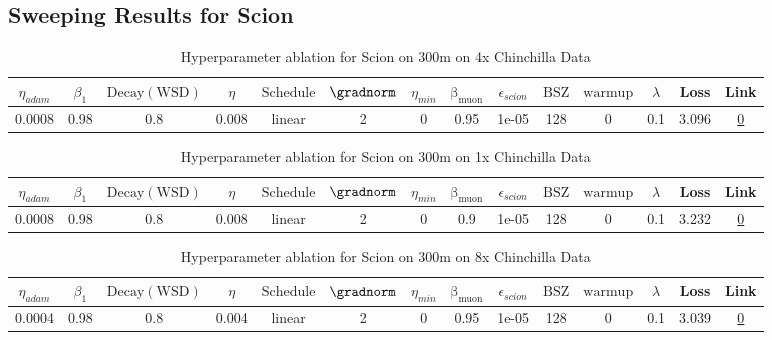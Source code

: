 \subsection{Sweeping Results for Scion}%
\begin{table}[H]
\centering
\caption{Hyperparameter ablation for Scion on 300m on 4x Chinchilla Data}
\label{tab:ablation_scion_300m_4}
\begin{tabular}{cccccccccccccc}
\toprule
$\eta_{adam}$ & $\beta_1$ & $\mathrm{Decay (WSD)}$ & $\eta$ & $\mathrm{Schedule}$ & $\gradnorm$ & $\eta_{min}$ & $\mathrm{\beta_{muon}}$ & $\epsilon_{scion}$ & $\mathrm{BSZ}$ & $\mathrm{warmup}$ & $\lambda$ & Loss & Link \\
\midrule
0.0008 & 0.98 & 0.8 & 0.008 & linear & 2 & 0 & 0.95 & 1e-05 & 128 & 0 & 0.1 & 3.096 & \href{https://wandb.ai/stanford-mercury/optimizer-scaling/runs/sweep-300m-24B-scion6ef04dlr0.008-wd0.1-minlr0-warmup0-b10.98-gn-4063d9}{0} \\
\midrule
\bottomrule
\end{tabular}
\end{table}

\begin{table}[H]
\centering
\caption{Hyperparameter ablation for Scion on 300m on 1x Chinchilla Data}
\label{tab:ablation_scion_300m_1}
\begin{tabular}{cccccccccccccc}
\toprule
$\eta_{adam}$ & $\beta_1$ & $\mathrm{Decay (WSD)}$ & $\eta$ & $\mathrm{Schedule}$ & $\gradnorm$ & $\eta_{min}$ & $\mathrm{\beta_{muon}}$ & $\epsilon_{scion}$ & $\mathrm{BSZ}$ & $\mathrm{warmup}$ & $\lambda$ & Loss & Link \\
\midrule
0.0008 & 0.98 & 0.8 & 0.008 & linear & 2 & 0 & 0.9 & 1e-05 & 128 & 0 & 0.1 & 3.232 & \href{https://wandb.ai/stanford-mercury/optimizer-scaling/runs/sweep-300m-6B-sciond108279lr0.008-wd0.1-minlr0-warmup0-b10.98-gn-99a9f4}{0} \\
\midrule
\bottomrule
\end{tabular}
\end{table}

\begin{table}[H]
\centering
\caption{Hyperparameter ablation for Scion on 300m on 8x Chinchilla Data}
\label{tab:ablation_scion_300m_8}
\begin{tabular}{cccccccccccccc}
\toprule
$\eta_{adam}$ & $\beta_1$ & $\mathrm{Decay (WSD)}$ & $\eta$ & $\mathrm{Schedule}$ & $\gradnorm$ & $\eta_{min}$ & $\mathrm{\beta_{muon}}$ & $\epsilon_{scion}$ & $\mathrm{BSZ}$ & $\mathrm{warmup}$ & $\lambda$ & Loss & Link \\
\midrule
0.0004 & 0.98 & 0.8 & 0.004 & linear & 2 & 0 & 0.95 & 1e-05 & 128 & 0 & 0.1 & 3.039 & \href{https://wandb.ai/stanford-mercury/optimizer-scaling/runs/sweep-300m-48B-scion0ebd9blr0.004-wd0.1-minlr0-warmup0-b10.98-gn-c7b0e6}{0} \\
\midrule
\bottomrule
\end{tabular}
\end{table}

